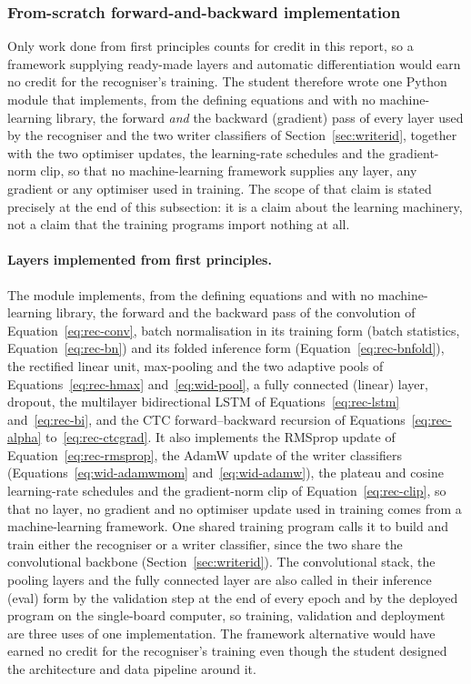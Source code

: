 \subsubsection{From-scratch forward-and-backward implementation}
\label{sec:textrec-numpynn}

Only work done from first principles counts for credit in this report, so a framework supplying ready-made layers and automatic differentiation would earn no credit for the recogniser's training.
The student therefore wrote one Python module that implements, from the defining equations and with no machine-learning library, the forward \emph{and} the backward (gradient) pass of every layer used by the recogniser and the two writer classifiers of Section~\ref{sec:writerid}, together with the two optimiser updates, the learning-rate schedules and the gradient-norm clip, so that no machine-learning framework supplies any layer, any gradient or any optimiser used in training.
The scope of that claim is stated precisely at the end of this subsection: it is a claim about the learning machinery, not a claim that the training programs import nothing at all.

\paragraph{Layers implemented from first principles.}
The module implements, from the defining equations and with no machine-learning library, the forward and the backward pass of the convolution of Equation~\ref{eq:rec-conv}, batch normalisation in its training form (batch statistics, Equation~\ref{eq:rec-bn}) and its folded inference form (Equation~\ref{eq:rec-bnfold}), the rectified linear unit, max-pooling and the two adaptive pools of Equations~\ref{eq:rec-hmax} and~\ref{eq:wid-pool}, a fully connected (linear) layer, dropout, the multilayer bidirectional LSTM of Equations~\ref{eq:rec-lstm} and~\ref{eq:rec-bi}, and the CTC forward--backward recursion of Equations~\ref{eq:rec-alpha} to~\ref{eq:rec-ctcgrad}.
It also implements the RMSprop update of Equation~\ref{eq:rec-rmsprop}, the AdamW update of the writer classifiers (Equations~\ref{eq:wid-adamwmom} and~\ref{eq:wid-adamw}), the plateau and cosine learning-rate schedules and the gradient-norm clip of Equation~\ref{eq:rec-clip}, so that no layer, no gradient and no optimiser update used in training comes from a machine-learning framework.
One shared training program calls it to build and train either the recogniser or a writer classifier, since the two share the convolutional backbone (Section~\ref{sec:writerid}).
The convolutional stack, the pooling layers and the fully connected layer are also called in their inference (eval) form by the validation step at the end of every epoch and by the deployed program on the single-board computer, so training, validation and deployment are three uses of one implementation.
The framework alternative would have earned no credit for the recogniser's training even though the student designed the architecture and data pipeline around it.

